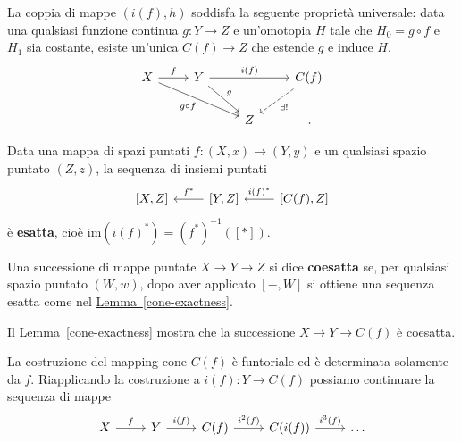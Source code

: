 \begin{fact}
	La coppia di mappe $(i(f),h)$ soddisfa la seguente
	proprietà universale:
	data una qualsiasi funzione continua $g:Y \to Z$
	e un'omotopia $H$ tale che $H_{0} = g \circ f$ e $H_{1}$
	sia costante, esiste un'unica $C(f) \to Z$ che estende $g$
	e induce $H$.
	\begin{equation*}
		\begin{tikzcd}
			X \ar[r, "f"] \ar[drr, "g \circ f"']
			& Y \ar[rr, "i(f)"] \ar[dr, "g"] & & C(f) \ar[dl, dashed, "\exists !"] \\
			& & Z & \,.
		\end{tikzcd}
	\end{equation*}
\end{fact}

\begin{lemma}\label{cone-exactness}
	Data una mappa di spazi puntati $f:(X,x) \to (Y,y)$
	e un qualsiasi spazio puntato $(Z,z)$,
	la sequenza di insiemi puntati
		\begin{equation*}
			\begin{tikzcd}
				{[X,Z]} & {[Y,Z]} \ar[l, "f^*"'] & {[C(f),Z]} \ar[l,"i(f)^*"']
			\end{tikzcd}
		\end{equation*}
		è \textbf{esatta}, cioè $\textrm{im}\left( i(f)^*\right) 
		= \left( f^* \right)^{-1}([\ast])$.
\end{lemma}

\begin{df}
	Una successione di mappe puntate $X \to Y \to Z$ si dice \textbf{coesatta}
	se, per qualsiasi spazio puntato $(W,w)$, dopo aver applicato $[-,W]$
	si ottiene una sequenza esatta come nel 
	\hyperref[cone-exactness]{Lemma~\ref{cone-exactness}}.
\end{df}

\begin{ex}
	Il \hyperref[cone-exactness]{Lemma~\ref{cone-exactness}} mostra che
	la successione $X \to Y \to C(f)$ è coesatta.
\end{ex}


La costruzione del mapping cone $C(f)$ è funtoriale
ed è determinata solamente da $f$. 
Riapplicando la costruzione a $i(f) : Y \to C(f)$
possiamo continuare la sequenza di mappe
\begin{equation*}
	\begin{tikzcd}
		X \ar[r, "f"]
		& Y \ar[r, "i(f)"]
		& C(f) \ar[r, "i^2(f)"]
		& C(i(f)) \ar[r, "i^3(f)"]
		& \dots
	\end{tikzcd}
\end{equation*}

